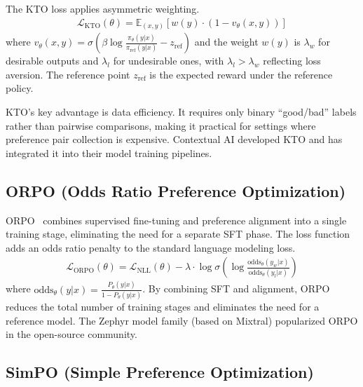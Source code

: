 \documentclass[12pt]{article}
\begin{document}
The KTO loss applies asymmetric weighting.
\begin{align}
\mathcal{L}_{\text{KTO}}(\theta) = \mathbb{E}_{(x, y)} \left[ w(y) \cdot \left(1 - v_\theta(x, y) \right) \right]
\end{align}
where $v_\theta(x, y) = \sigma\!\left(\beta \log \frac{\pi_\theta(y|x)}{\pi_{\text{ref}}(y|x)} - z_{\text{ref}}\right)$ and the weight $w(y)$ is $\lambda_w$ for desirable outputs and $\lambda_l$ for undesirable ones, with $\lambda_l > \lambda_w$ reflecting loss aversion. The reference point $z_{\text{ref}}$ is the expected reward under the reference policy.

KTO's key advantage is data efficiency. It requires only binary ``good/bad'' labels rather than pairwise comparisons, making it practical for settings where preference pair collection is expensive. Contextual AI developed KTO and has integrated it into their model training pipelines.

\subsection{ORPO (Odds Ratio Preference Optimization)}

ORPO~\cite{Hong2024ORPO} combines supervised fine-tuning and preference alignment into a single training stage, eliminating the need for a separate SFT phase. The loss function adds an odds ratio penalty to the standard language modeling loss.
\begin{align}
\mathcal{L}_{\text{ORPO}}(\theta) = \mathcal{L}_{\text{NLL}}(\theta) - \lambda \cdot \log \sigma\!\left( \log \frac{\text{odds}_\theta(y_w | x)}{\text{odds}_\theta(y_l | x)} \right)
\end{align}
where $\text{odds}_\theta(y|x) = \frac{P_\theta(y|x)}{1 - P_\theta(y|x)}$. By combining SFT and alignment, ORPO reduces the total number of training stages and eliminates the need for a reference model. The Zephyr model family (based on Mixtral) popularized ORPO in the open-source community.

\subsection{SimPO (Simple Preference Optimization)}
\end{document}
